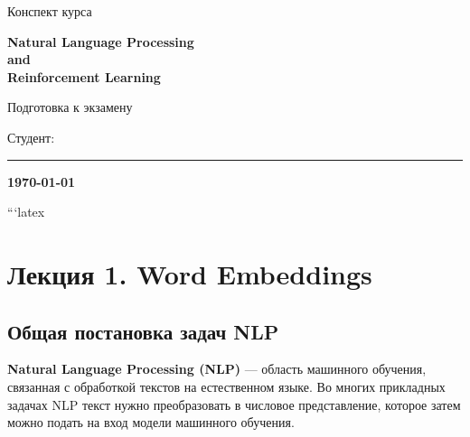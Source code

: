 \documentclass[a4paper,12pt]{article}
\begin{document}

\begin{titlepage}

\begin{center}

\vspace*{2cm}

{\Large Конспект курса}

\vspace{0.5cm}

{\Huge \textbf{Natural Language Processing \\ and \\ Reinforcement Learning}}

\vspace{2cm}

{\Large Подготовка к экзамену}

\vfill

\begin{flushright}
Студент: \rule{6cm}{0.4pt}
\end{flushright}

\vfill

\large
\textbf{\today}

\end{center}

\end{titlepage}


\tableofcontents

\newpage


```latex
\section{Лекция 1. Word Embeddings}

\subsection{Общая постановка задач NLP}

\textbf{Natural Language Processing (NLP)} --- область машинного обучения, связанная с обработкой текстов на естественном языке. Во многих прикладных задачах NLP текст нужно преобразовать в числовое представление, которое затем можно подать на вход модели машинного обучения.
\end{document}
